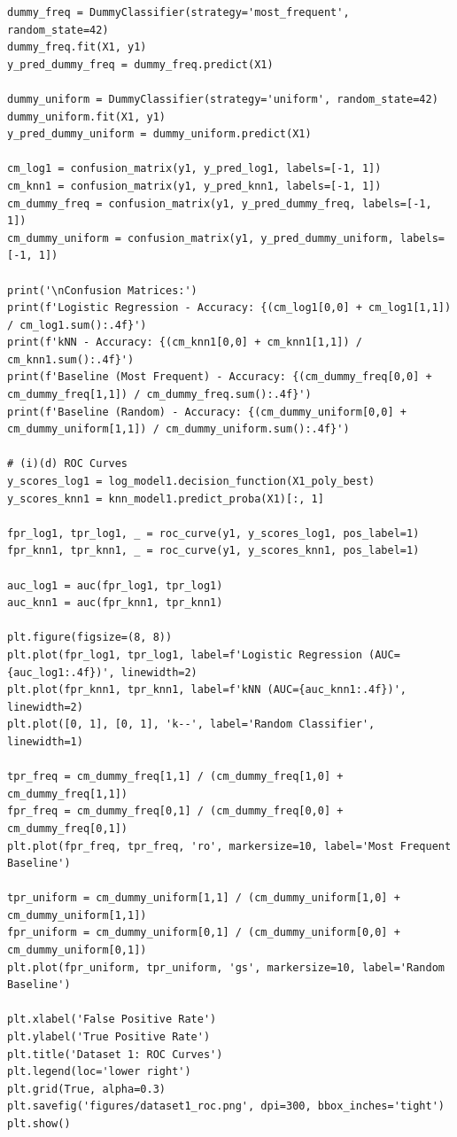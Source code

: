 \documentclass[11pt,a4paper]{article}
\begin{document}
\begin{lstlisting}
dummy_freq = DummyClassifier(strategy='most_frequent', random_state=42)
dummy_freq.fit(X1, y1)
y_pred_dummy_freq = dummy_freq.predict(X1)

dummy_uniform = DummyClassifier(strategy='uniform', random_state=42)
dummy_uniform.fit(X1, y1)
y_pred_dummy_uniform = dummy_uniform.predict(X1)

cm_log1 = confusion_matrix(y1, y_pred_log1, labels=[-1, 1])
cm_knn1 = confusion_matrix(y1, y_pred_knn1, labels=[-1, 1])
cm_dummy_freq = confusion_matrix(y1, y_pred_dummy_freq, labels=[-1, 1])
cm_dummy_uniform = confusion_matrix(y1, y_pred_dummy_uniform, labels=[-1, 1])

print('\nConfusion Matrices:')
print(f'Logistic Regression - Accuracy: {(cm_log1[0,0] + cm_log1[1,1]) / cm_log1.sum():.4f}')
print(f'kNN - Accuracy: {(cm_knn1[0,0] + cm_knn1[1,1]) / cm_knn1.sum():.4f}')
print(f'Baseline (Most Frequent) - Accuracy: {(cm_dummy_freq[0,0] + cm_dummy_freq[1,1]) / cm_dummy_freq.sum():.4f}')
print(f'Baseline (Random) - Accuracy: {(cm_dummy_uniform[0,0] + cm_dummy_uniform[1,1]) / cm_dummy_uniform.sum():.4f}')

# (i)(d) ROC Curves
y_scores_log1 = log_model1.decision_function(X1_poly_best)
y_scores_knn1 = knn_model1.predict_proba(X1)[:, 1]

fpr_log1, tpr_log1, _ = roc_curve(y1, y_scores_log1, pos_label=1)
fpr_knn1, tpr_knn1, _ = roc_curve(y1, y_scores_knn1, pos_label=1)

auc_log1 = auc(fpr_log1, tpr_log1)
auc_knn1 = auc(fpr_knn1, tpr_knn1)

plt.figure(figsize=(8, 8))
plt.plot(fpr_log1, tpr_log1, label=f'Logistic Regression (AUC={auc_log1:.4f})', linewidth=2)
plt.plot(fpr_knn1, tpr_knn1, label=f'kNN (AUC={auc_knn1:.4f})', linewidth=2)
plt.plot([0, 1], [0, 1], 'k--', label='Random Classifier', linewidth=1)

tpr_freq = cm_dummy_freq[1,1] / (cm_dummy_freq[1,0] + cm_dummy_freq[1,1])
fpr_freq = cm_dummy_freq[0,1] / (cm_dummy_freq[0,0] + cm_dummy_freq[0,1])
plt.plot(fpr_freq, tpr_freq, 'ro', markersize=10, label='Most Frequent Baseline')

tpr_uniform = cm_dummy_uniform[1,1] / (cm_dummy_uniform[1,0] + cm_dummy_uniform[1,1])
fpr_uniform = cm_dummy_uniform[0,1] / (cm_dummy_uniform[0,0] + cm_dummy_uniform[0,1])
plt.plot(fpr_uniform, tpr_uniform, 'gs', markersize=10, label='Random Baseline')

plt.xlabel('False Positive Rate')
plt.ylabel('True Positive Rate')
plt.title('Dataset 1: ROC Curves')
plt.legend(loc='lower right')
plt.grid(True, alpha=0.3)
plt.savefig('figures/dataset1_roc.png', dpi=300, bbox_inches='tight')
plt.show()


\end{lstlisting}
\end{document}
